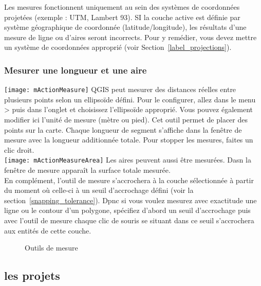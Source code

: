 Les mesures fonctionnent uniquement au sein des systèmes de coordonnées projetées (exemple : UTM, Lambert 93). SI la couche active est définie par système géographique de coordonnée (latitude/longitude), les résultats d'une mesure de ligne ou d'aires seront incorrects. Pour y remédier, vous devez mettre un système de coordonnées approprié (voir Section~\ref{label_projections}).

\subsubsection{Mesurer une longueur et une aire}
\texttt{[image: mActionMeasure]} 
QGIS peut mesurer des distances réelles entre plusieurs points selon un ellipsoïde défini. Pour le configurer, allez dans le menu  > puis dans l'onglet  et choisissez l'ellipsoïde approprié. Vous pouvez également modifier ici l'unité de mesure (mètre ou pied). Cet outil permet de placer des points sur la carte. Chaque longueur de segment s'affiche dans la fenêtre de mesure avec la longueur additionnée totale. Pour stopper les mesures, faites un clic droit. \\
\texttt{[image: mActionMeasureArea]} Les aires peuvent aussi être mesurées.
Dasn la fenêtre de mesure apparaît la surface totale mesurée. \\
En complément, l'outil de mesure s'accrochera à la couche sélectionnée à partir du moment où celle-ci à un seuil d'accrochage défini (voir la section~\ref{snapping_tolerance}). Dpnc si vous voulez mesurez avec exactitude une ligne ou le contour d'un polygone, spécifiez d'abord un seuil d'accrochage puis avec l'outil de mesure chaque clic de souris se situant dans ce seuil s'accrochera aux entités de cette couche.

\begin{figure}[h]
\caption{Outils de mesure \nixcaption} \label{fig:measure}
\centering
  \goodgap
\end{figure}

\subsection{les projets}\label{sec:projects}

